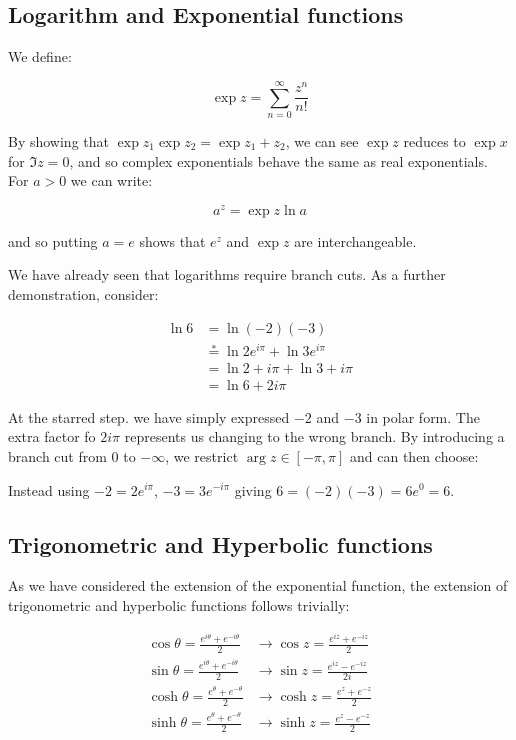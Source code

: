 \documentclass{../../physics_notes}
\begin{document}
\subsection{Logarithm and Exponential functions}

We define:

\[\exp{z} = \sum_{n=0}^\infty \frac{z^n}{n!} \]

By showing that $\exp{z_1}\exp{z_2} = \exp{z_1 + z_2}$, we can see $\exp{z}$ reduces to $\exp{x}$ for $\Im{z} = 0$, and so complex exponentials behave the same as real exponentials. For $a > 0$ we can write:

\[ a^z = \exp{z\ln{a}} \]

and so putting $a = e$ shows that $e^z$ and $\exp{z}$ are interchangeable.

We have already seen that logarithms require branch cuts. As a further demonstration, consider:

\begin{align*}
\ln{6} &= \ln{(-2)(-3)} \\
&\stackrel{*}{=} \ln{2e^{i\pi}} + \ln{3e^{i\pi}} \\
&= \ln{2} + i\pi + \ln{3} + i\pi \\
&= \ln{6} + 2i\pi
\end{align*}

At the starred step. we have simply expressed $-2$ and $-3$ in polar form. The extra factor fo $2i\pi$ represents us changing to the wrong branch. By introducing a branch cut from $0$ to $-\infty$, we restrict $\arg{z} \in [-\pi,\pi]$ and can then choose:

Instead using $-2 = 2e^{i\pi}$, $-3 = 3e^{-i\pi}$ giving $6 = (-2)(-3) = 6e^{0} = 6$.

\subsection{Trigonometric and Hyperbolic functions}

As we have considered the extension of the exponential function, the extension of trigonometric and hyperbolic functions follows trivially:

\begin{align*}
\cos{\theta} = \frac{e^{i\theta} + e^{-i\theta}}{2} &\longrightarrow \cos{z} = \frac{e^{iz} + e^{-iz}}{2}\\
\sin{\theta} = \frac{e^{i\theta} + e^{-i\theta}}{2} &\longrightarrow \sin{z} = \frac{e^{iz} - e^{-iz}}{2i}\\
\cosh{\theta} = \frac{e^{\theta} + e^{-\theta}}{2} &\longrightarrow \cosh{z} = \frac{e^{z} + e^{-z}}{2}\\
\sinh{\theta} = \frac{e^{\theta} + e^{-\theta}}{2} &\longrightarrow \sinh{z} = \frac{e^{z} - e^{-z}}{2}
\end{align*}
\end{document}
